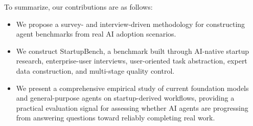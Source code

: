 To summarize, our contributions are as follows:

\begin{itemize}
    \item We propose a survey- and interview-driven methodology for constructing agent benchmarks from real AI adoption scenarios.
    \item We construct StartupBench, a benchmark built through AI-native startup research, enterprise-user interviews, user-oriented task abstraction, expert data construction, and multi-stage quality control.
    \item We present a comprehensive empirical study of current foundation models and general-purpose agents on startup-derived workflows, providing a practical evaluation signal for assessing whether AI agents are progressing from answering questions toward reliably completing real work.
\end{itemize}


